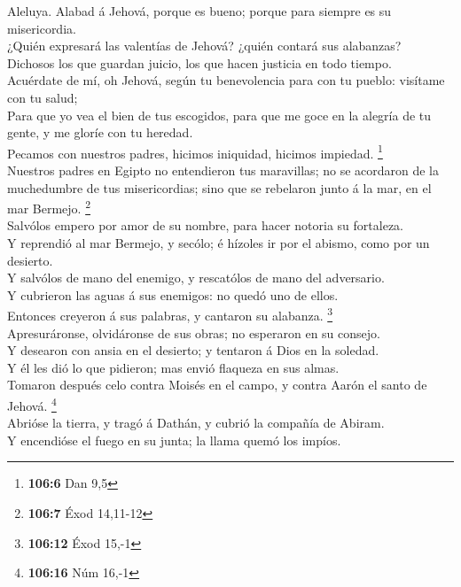  Aleluya. Alabad á Jehová, porque es bueno; porque para
siempre es su misericordia.\\
 ¿Quién expresará las valentías de Jehová? ¿quién contará
sus alabanzas?\\
 Dichosos los que guardan juicio, los que hacen justicia
en todo tiempo.\\
 Acuérdate de mí, oh Jehová, según tu benevolencia para
con tu pueblo: visítame con tu salud;\\
 Para que yo vea el bien de tus escogidos, para que me
goce en la alegría de tu gente, y me gloríe con tu heredad.\\
 Pecamos con nuestros padres, hicimos iniquidad, hicimos
impiedad. \footnote{\textbf{106:6} Dan 9,5}\\
 Nuestros padres en Egipto no entendieron tus maravillas;
no se acordaron de la muchedumbre de tus misericordias; sino que se
rebelaron junto á la mar, en el mar Bermejo. \footnote{\textbf{106:7}
  Éxod 14,11-12}\\
 Salvólos empero por amor de su nombre, para hacer notoria
su fortaleza.\\
 Y reprendió al mar Bermejo, y secólo; é hízoles ir por el
abismo, como por un desierto.\\
 Y salvólos de mano del enemigo, y rescatólos de mano del
adversario.\\
 Y cubrieron las aguas á sus enemigos: no quedó uno de
ellos.\\
 Entonces creyeron á sus palabras, y cantaron su
alabanza. \footnote{\textbf{106:12} Éxod 15,-1}\\
 Apresuráronse, olvidáronse de sus obras; no esperaron en
su consejo.\\
 Y desearon con ansia en el desierto; y tentaron á Dios
en la soledad.\\
 Y él les dió lo que pidieron; mas envió flaqueza en sus
almas.\\
 Tomaron después celo contra Moisés en el campo, y contra
Aarón el santo de Jehová. \footnote{\textbf{106:16} Núm 16,-1}\\
 Abrióse la tierra, y tragó á Dathán, y cubrió la
compañía de Abiram.\\
 Y encendióse el fuego en su junta; la llama quemó los
impíos.\\
